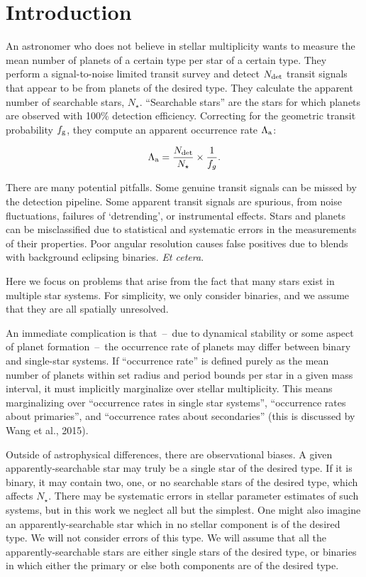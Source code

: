 \section{Introduction}

An astronomer who does not believe in stellar multiplicity wants to measure the
mean number of planets of a certain type per star of a certain type.
They perform a signal-to-noise limited transit survey and detect $N_{\rm det}$ 
transit signals that appear to be from planets of the desired type.  They 
calculate the apparent number of searchable stars, $N_\star$.  ``Searchable 
stars'' are the stars for which 
planets are observed with 100\% detection efficiency. 
Correcting for the geometric 
transit probability $f_{\rm g}$, they compute an apparent occurrence rate 
$\Lambda_{\rm a}$:

\begin{equation}
\Lambda_{\rm a} = \frac{N_{\rm det}}{N_\star} \times \frac{1}{f_g}.
\end{equation}

There are many potential pitfalls.  Some genuine transit signals can be missed
by the detection pipeline.  Some apparent transit signals are spurious, from
noise fluctuations, failures of `detrending', or instrumental effects.  Stars
and planets can be misclassified due to statistical and systematic errors in
the measurements of their properties.  Poor angular resolution causes false
positives due to blends with background eclipsing binaries. {\it Et cetera}.

Here we focus on problems that arise from the fact that many stars exist in 
multiple star systems.
For simplicity, we only consider binaries, and we assume that they are all 
spatially unresolved.

An immediate complication is that~--~due to dynamical stability or some 
aspect of planet formation~--~the occurrence rate of planets may differ 
between binary and single-star systems.
If ``occurrence rate'' is defined purely as the mean number of planets within 
set radius and period bounds per star in a given mass interval, it must 
implicitly marginalize over stellar multiplicity.
This means marginalizing over ``occurrence rates in single star systems'', 
``occurrence rates about primaries'', and
``occurrence rates about secondaries'' (this is discussed by Wang et al., 
2015).

Outside of astrophysical differences, there are observational biases.
A given apparently-searchable star may truly be a single star of the desired 
type. If it is binary, it may contain two, one, or no searchable stars of the 
desired type, which affects $N_\star$.
There may be systematic errors in stellar parameter estimates of such 
systems, but in this work we neglect all but the simplest.
One might also imagine an apparently-searchable star which in no stellar 
component is of the desired type. We will not consider errors of this type.  
We will assume that all the apparently-searchable stars are either single 
stars of the desired type, or binaries in which either the primary or else 
both components are of the desired type.

